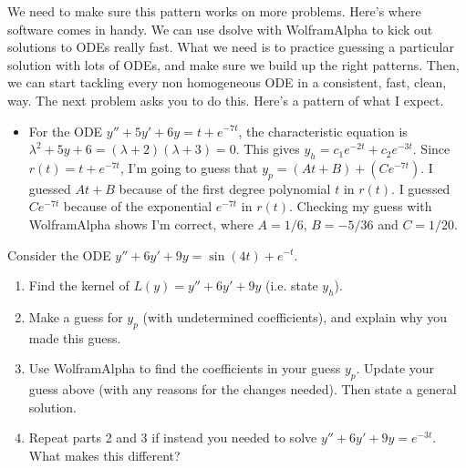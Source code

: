 We need to make sure this pattern works on more problems. Here's where software comes in handy.  We can use dsolve with WolframAlpha to kick out solutions to ODEs really fast. What we need is to practice guessing a particular solution with lots of ODEs, and make sure we build up the right patterns.  Then, we can start tackling every non homogeneous ODE in a consistent, fast, clean, way. The next problem asks you to do this.  Here's a pattern of what I expect.
\begin{itemize}
 \item For the ODE $y''+5y'+6y=t+e^{-7t}$, the characteristic equation is $\lambda^2+5y+6 = (\lambda+2)(\lambda+3)=0$. This gives $y_h=c_1e^{-2t}+c_2e^{-3t}$.  Since $r(t)=t+e^{-7t}$, I'm going to guess that $y_p=(At+B)+(Ce^{-7t})$. I guessed $At+B$ because of the first degree polynomial $t$ in $r(t)$.  I guessed $Ce^{-7t}$ because of the exponential $e^{-7t}$ in $r(t)$. Checking my guess with WolframAlpha shows I'm correct, where $A=1/6$, $B=-5/36$ and $C=1/20$.  
\end{itemize}




\begin{problem}
Consider the ODE $y''+6y'+9y=\sin(4t)+e^{-t}$.
\begin{enumerate}
 \item Find the kernel of $L(y) = y''+6y'+9y$ (i.e. state $y_h$). 
 \item Make a guess for $y_p$ (with undetermined coefficients), and explain why you made this guess.
 \item Use WolframAlpha to find the coefficients in your guess $y_p$. Update your guess above (with any reasons for the changes needed). %
 Then state a general solution.
 \item Repeat parts 2 and 3 if instead you needed to solve $y''+6y'+9y=e^{-3t}$. What makes this different?
\end{enumerate}

\end{problem}

